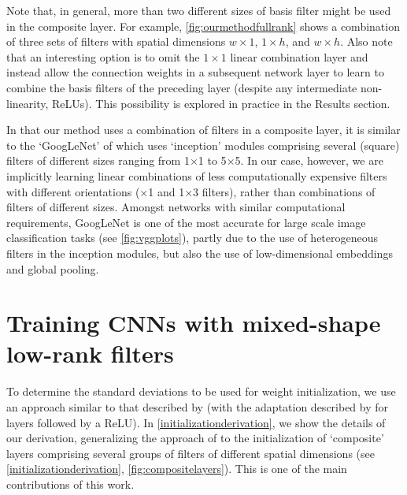 \documentclass[thesis]{subfiles}
\begin{document}
    Note that, in general, more than two different sizes of basis filter might be used in the composite layer. For example,  \cref{fig:ourmethodfullrank} shows a combination of three sets of filters with spatial dimensions $w \times 1$, $1 \times h$, and $w \times h$. Also note that an interesting option is to omit the $1 \times 1$ linear combination layer and instead allow the connection weights in a subsequent network layer to learn to combine the basis filters of the preceding layer (despite any intermediate non-linearity, \eg ReLUs). This possibility is explored in practice in the Results section.
    
    In that our method uses a combination of filters in a composite layer, it is similar to the `GoogLeNet' of \citet{Szegedy2014going} which uses `inception' modules comprising several (square) filters of different sizes ranging from 1$\times$1 to 5$\times$5. In our case, however, we are implicitly learning linear combinations of less computationally expensive filters with different orientations ($\times$1 and 1$\times$3 filters), rather than combinations of filters of different sizes. Amongst networks with similar computational requirements, GoogLeNet is one of the most accurate for large scale image classification tasks (see \cref{fig:vggplots}), partly due to the use of heterogeneous filters in the inception modules, but also the use of low-dimensional embeddings and global pooling.

    \section{Training CNNs with mixed-shape low-rank filters}\label{initialization}
    To determine the standard deviations to be used for weight initialization, we use an approach similar to that described by \citet{glorot2010understanding} (with the adaptation described by \citet{He2015b} for layers followed by a ReLU). In \cref{initializationderivation}, we show the details of our derivation, generalizing the approach of \citet{He2015b} to the initialization of `composite' layers comprising several groups of filters of different spatial dimensions (see \cref{initializationderivation}, \cref{fig:compositelayers}). This is one of the main contributions of this work.
    
\end{document}
